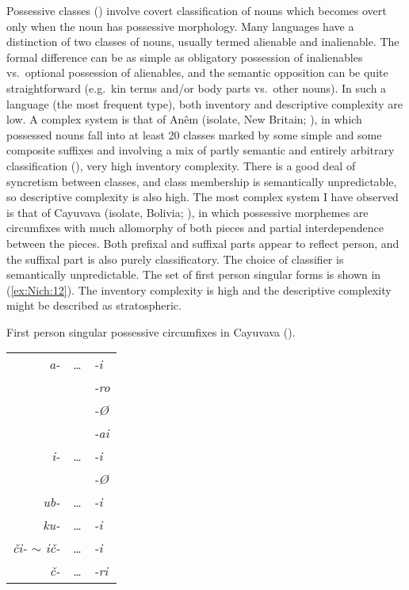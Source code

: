 \documentclass[output=collectionpaper]{langsci/langscibook}
\begin{document}
Possessive classes (\citealt{Nichols2013,Bickel2013a}) involve covert classification of nouns which becomes overt only when the noun has possessive morphology. Many languages have a distinction of two classes of nouns, usually termed alienable and inalienable. The formal difference can be as simple as obligatory possession of inalienables vs.\ optional possession of alienables, and the semantic opposition can be quite straightforward (e.g.\ kin terms and/or body parts vs.\ other nouns). In such a language (the most frequent type), both inventory and descriptive complexity are low. A complex system is that of Anêm (isolate, New Britain; \citealt{Thurston1982}), in which possessed nouns fall into at least 20 classes marked by some simple and some composite suffixes and involving a mix of partly semantic and entirely arbitrary classification (\citealt[37--38]{Thurston1982}), very high inventory complexity. There is a good deal of syncretism between classes, and class membership is semantically unpredictable, so descriptive complexity is also high. The most complex system I have observed is that of Cayuvava (isolate, Bolivia; \citealt{Key1967}), in which possessive morphemes are circumfixes with much allomorphy of both pieces and partial interdependence between the pieces. Both prefixal and suffixal parts appear to reflect person, and the suffixal part is also purely classificatory. The choice of classifier is semantically unpredictable. The set of first person singular forms is shown in (\ref{ex:Nich:12}). The inventory complexity is high and the descriptive complexity might be described as stratospheric.

\ea
\label{ex:Nich:12}
First person singular possessive circumfixes in Cayuvava (\citealt{Key1967}). \\
\medskip
\begin{tabular}{>{\itshape}r>{\itshape}l>{\itshape}l}
		a- & \ldots &	-i \\
			& & -ro \\
			& & -Ø	 \\
			 && -ai	 \\
		i-  & \ldots & 	-i	 \\
			 && -Ø	 \\
		ub-  & \ldots &	-i \\
		ku-  & \ldots & 	-i \\
		či- $\sim$ ič- & \ldots & -i		 \\
		č- & \ldots &	-ri	 \\
\end{tabular}
\z
\end{document}

